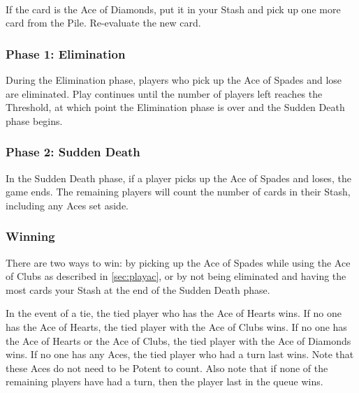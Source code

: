 \documentclass{article}
\begin{document}
\paragraph{\label{par:playclubsdiamonds}}
If the card is the Ace of Diamonds, put it in your Stash and pick up one
more card from the Pile. Re-evaluate the new card.


\subsubsection{Phase 1: Elimination \label{sec:elimination}}

During the Elimination phase, players who pick up the Ace of Spades and
lose are eliminated. Play continues until the number of players left
reaches the Threshold, at which point the Elimination phase is over and
the Sudden Death phase begins.

\subsubsection{Phase 2: Sudden Death \label{sec:sd}}

In the Sudden Death phase, if a player picks up the Ace of Spades and
loses, the game ends. The remaining players will count the number of
cards in their Stash, including any Aces set aside.

\subsubsection{Winning \label{sec:winning}}

There are two ways to win: by picking up the Ace of Spades while using
the Ace of Clubs as described in \autoref{sec:playac}, or by not being
eliminated and having the most cards your Stash at the end of the Sudden
Death phase.

In the event of a tie, the tied player who has the Ace of Hearts wins.
If no one has the Ace of Hearts, the tied player with the Ace of Clubs
wins. If no one has the Ace of Hearts or the Ace of Clubs, the tied
player with the Ace of Diamonds wins. If no one has any Aces, the tied
player who had a turn last wins. Note that these Aces do not need to be
Potent to count. Also note that if none of the remaining players have
had a turn, then the player last in the queue wins.

\newpage
\end{document}
